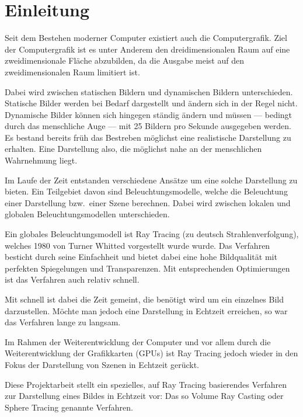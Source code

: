 
\chapter{Einleitung}
\label{chap:10_introduction}

Seit dem Bestehen moderner Computer existiert auch die Computergrafik. Ziel der Computergrafik ist es unter Anderem den dreidimensionalen Raum auf eine zweidimensionale Fläche abzubilden, da die Ausgabe meist auf den zweidimensionalen Raum limitiert ist.

Dabei wird zwischen statischen Bildern und dynamischen Bildern unterschieden. Statische Bilder werden bei Bedarf dargestellt und ändern sich in der Regel nicht. Dynamische Bilder können sich hingegen ständig ändern und müssen --- bedingt durch das menschliche Auge --- mit 25 Bildern pro Sekunde ausgegeben werden. Es bestand bereits früh das Bestreben möglichst eine realistische Darstellung zu erhalten. Eine Darstellung also, die möglichst nahe an der menschlichen Wahrnehmung liegt.

Im Laufe der Zeit entstanden verschiedene Ansätze um eine solche Darstellung zu bieten. Ein Teilgebiet davon sind Beleuchtungsmodelle, welche die Beleuchtung einer Darstellung bzw.\ einer Szene berechnen. Dabei wird zwischen lokalen und globalen Beleuchtungsmodellen unterschieden.

Ein globales Beleuchtungsmodell ist Ray Tracing (zu deutsch Strahlenverfolgung), welches 1980 von Turner Whitted vorgestellt wurde wurde. Das Verfahren besticht durch seine Einfachheit und bietet dabei eine hohe Bildqualität mit perfekten Spiegelungen und Transparenzen. Mit entsprechenden Optimierungen ist das Verfahren auch relativ schnell.

Mit schnell ist dabei die Zeit gemeint, die benötigt wird um ein einzelnes Bild darzustellen. Möchte man jedoch eine Darstellung in Echtzeit erreichen, so war das Verfahren lange zu langsam.

Im Rahmen der Weiterentwicklung der Computer und vor allem durch die Weiterentwicklung der Grafikkarten (GPUs) ist Ray Tracing jedoch wieder in den Fokus der Darstellung von Szenen in Echtzeit gerückt.

Diese Projektarbeit stellt ein spezielles, auf Ray Tracing basierendes Verfahren zur Darstellung eines Bildes in Echtzeit vor: Das so Volume Ray Casting oder Sphere Tracing genannte Verfahren.
